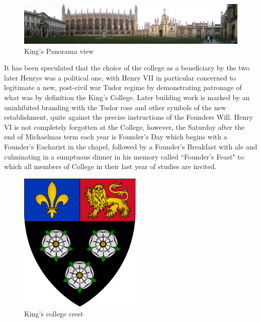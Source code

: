 \begin{figure}[!]
\centering
\includegraphics[scale=0.85]{Chapter2/Figures/Panorama.jpg}
\caption{King's Panorama view}
\label{fig:pan}
\end{figure}

It has been speculated that the choice of the college as a beneficiary by the two later Henrys was a political one, with Henry VII in particular concerned to legitimate a new, post-civil war Tudor regime by demonstrating patronage of what was by definition the King's College. Later building work is marked by an uninhibited branding with the Tudor rose and other symbols of the new establishment, quite against the precise instructions of the Founders Will. Henry VI is not completely forgotten at the College, however, the Saturday after the end of Michaelmas term each year is Founder's Day which begins with a Founder's Eucharist in the chapel, followed by a Founder's Breakfast with ale and culminating in a sumptuous dinner in his memory called ``Founder's Feast" to which all members of College in their last year of studies are invited.

\begin{figure}
\centering
\includegraphics[scale=0.85]{Chapter2/Figures/Crest.pdf}
\caption{King's college crest}
\label{fig:crest}
\end{figure}


